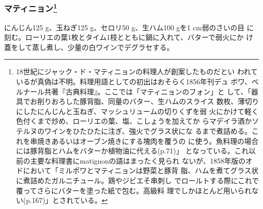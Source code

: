 \begin{recette}
\maeaki

\hypertarget{matignon}{%
\subsubsection[マティニョン]{\texorpdfstring{マティニョン\footnote{18世紀にジャック・ド・マティニョンの料理人が創案したものだとい
  われているが真偽は不明。料理用語としての初出はおそらく1856年刊デュ
  ボワ、ベルナール共著『古典料理』。ここでは「マティニョンのフォン」と
  して、「器具でお削りおろした豚背脂、同量のバター、生ハムのスライス
  数枚、薄切りにしたにんじんと玉ねぎ、マッシュリュームの切りくずを弱
  火にかけて軽く色付くまで炒め、ローリエの葉、塩、こしょうを加えてか
  らマデイラ酒かソテルヌのワインをひたひたに注ぎ、強火でグラス状にな
  るまで煮詰める。これを串焼きあるいはオーブン焼きにする塊肉を覆うの
  に使う。魚料理の場合には豚背脂とハムをバターか植物油に代える(p.71)」
  となっている。これ以前の主要な料理書にmatignonの語はまったく見られ
  ないが、1858年版のオドにおいて「ミルポワとマティニョンは野菜と豚背
  脂、ハムを煮てグラス状に煮詰めたガルニチュール。鶏やジビエそ串刺し
  でロールトする際にこれで覆ってさらにバターを塗った紙で包む。高級料
  理でしかほとんど用いられない(p.167)」とされている。}}{マティニョン}}\label{matignon}}


 

にんじん125 g、玉ねぎ125 g、セロリ50 g、生ハム100 gを1 cm弱のさいの目
に刻む。ローリエの葉1枚とタイム1枝とともに鍋に入れて、バターで弱火にか
け蓋をして蒸し煮し、少量の白ワインでデグラセする。

\maeaki

\hypertarget{mirepoix}{%
}
\end{recette}
